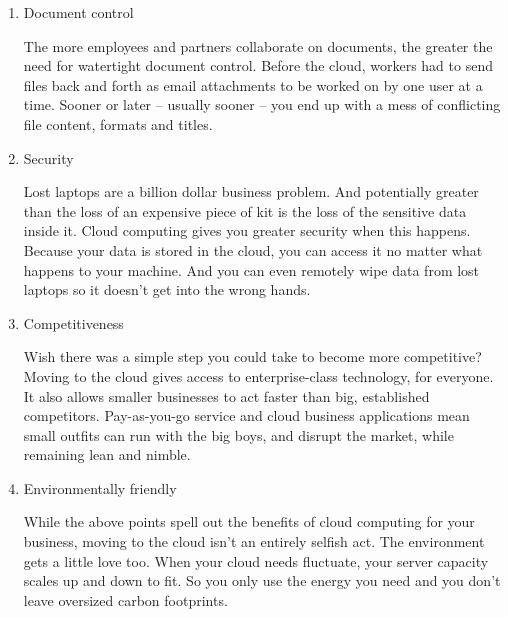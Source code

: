 \begin{enumerate}
    \item Document control
    \par The more employees and partners collaborate on documents, the greater the need for watertight document control. Before the cloud, workers had to send files back and forth as email attachments to be worked on by one user at a time. Sooner or later – usually sooner – you end up with a mess of conflicting file content, formats and titles\cite{ben}.
    
    \item Security
    \par Lost laptops are a billion dollar business problem. And potentially greater than the loss of an expensive piece of kit is the loss of the sensitive data inside it. Cloud computing gives you greater security when this happens. Because your data is stored in the cloud, you can access it no matter what happens to your machine. And you can even remotely wipe data from lost laptops so it doesn’t get into the wrong hands\cite{ben}.
    
    \item Competitiveness
    \par Wish there was a simple step you could take to become more competitive? Moving to the cloud gives access to enterprise-class technology, for everyone. It also allows smaller businesses to act faster than big, established competitors. Pay-as-you-go service and cloud business applications mean small outfits can run with the big boys, and disrupt the market, while remaining lean and nimble\cite{ben}.
    
    \item Environmentally friendly
    \par While the above points spell out the benefits of cloud computing for your business, moving to the cloud isn’t an entirely selfish act. The environment gets a little love too. When your cloud needs fluctuate, your server capacity scales up and down to fit. So you only use the energy you need and you don’t leave oversized carbon footprints\cite{ben}.
    
    \end{enumerate}
    \clearpage

